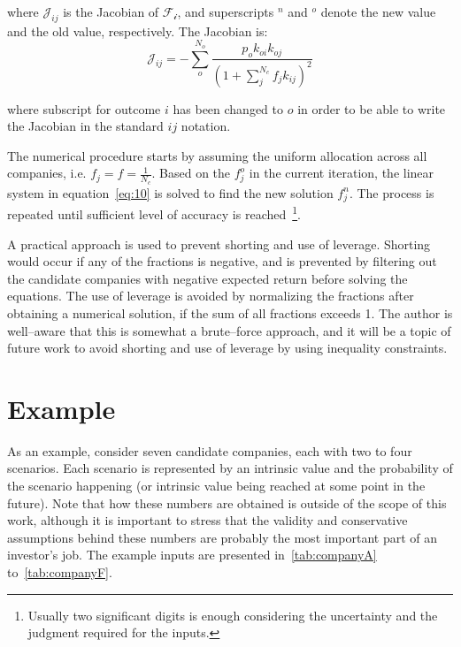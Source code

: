 \documentclass{article}
\begin{document}
\noindent where $\mathcal{J}_{ij}$ is the Jacobian of $\mathcal{F_i}$, and
superscripts $^n$ and $^o$ denote the new value and the old value, respectively.
The Jacobian is:
\begin{equation}
\label{eq:11}
    \mathcal{J}_{ij}
  = 
    - \sum_{o}^{N_o}
      \frac{p_o k_{oi} k_{oj}}{\left(1 + \sum_{j}^{N_c} f_j k_{ij} \right)^2}
\end{equation}

\noindent where subscript for outcome $i$ has been changed to $o$ in order to be
able to write the Jacobian in the standard $ij$ notation.

The numerical procedure starts by assuming the uniform allocation across
all companies, i.e. $f_j = f = \frac{1}{N_c}$. Based on the $f_j^o$ in the
current iteration, the linear system in equation~\eqref{eq:10} is solved to find
the new solution $f_j^n$. The process is repeated until sufficient level of
accuracy is reached~\footnote{Usually two significant digits is enough
considering the uncertainty and the judgment required for the inputs.}.

A practical approach is used to prevent shorting and use of leverage. Shorting
would occur if any of the fractions is negative, and is prevented by filtering
out the candidate companies with negative expected return before solving the
equations. The use of leverage is avoided by normalizing the fractions after
obtaining a numerical solution, if the sum of all fractions exceeds 1. The
author is well--aware that this is somewhat a brute--force approach, and it will
be a topic of future work to avoid shorting and use of leverage by using
inequality constraints.

\section{Example}
\label{sec:example}

\noindent As an example, consider seven candidate companies, each with two to
four scenarios. Each scenario is represented by an intrinsic value and the
probability of the scenario happening (or intrinsic value being reached at some
point in the future). Note that how these numbers are obtained is outside of the
scope of this work, although it is important to stress that the validity and
conservative assumptions behind these numbers are probably the most important
part of an investor's job. The example inputs are presented
in~\autoref{tab:companyA} to~\autoref{tab:companyF}.
\end{document}
